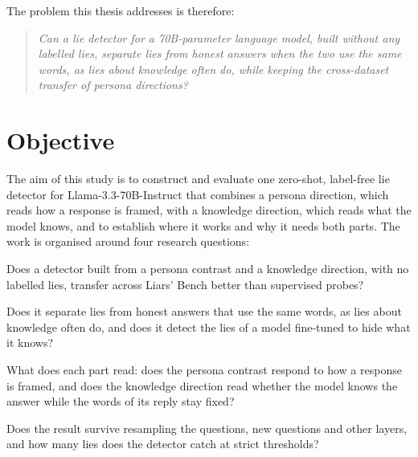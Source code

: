 The problem this thesis addresses is therefore:

\begin{quote}
\emph{Can a lie detector for a 70B-parameter language model, built without any labelled lies,
separate lies from honest answers when the two use the same words, as lies about knowledge often do,
while keeping the cross-dataset transfer of persona directions?}
\end{quote}

\section{Objective}
\label{sec:objective}

The aim of this study is to construct and evaluate one zero-shot, label-free lie detector for
Llama-3.3-70B-Instruct that combines a persona direction, which reads how a response is framed, with a
knowledge direction, which reads what the model knows, and to establish where it works and why it
needs both parts. The work is organised around four research questions:

\begin{description}[leftmargin=1.2em, labelindent=0em, itemsep=2pt]
\item[RQ1: Transfer.] Does a detector built from a persona contrast and a knowledge direction, with
  no labelled lies, transfer across Liars' Bench better than supervised probes?
\item[RQ2: The same words.] Does it separate lies from honest answers that use the same words, as
  lies about knowledge often do, and does it detect the lies of a model fine-tuned to hide what it
  knows?
\item[RQ3: The two parts.] What does each part read: does the persona contrast respond to how a
  response is framed, and does the knowledge direction read whether the model knows the answer while
  the words of its reply stay fixed?
\item[RQ4: Robustness and operating points.] Does the result survive resampling the questions, new
  questions and other layers, and how many lies does the detector catch at strict thresholds?
\end{description}

